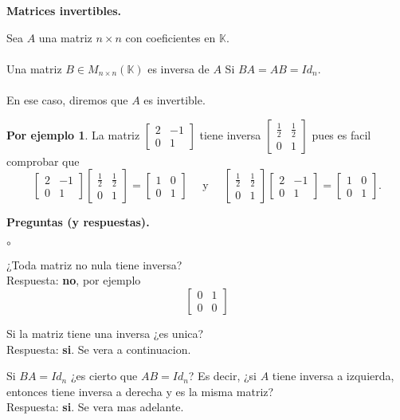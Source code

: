 \documentclass{article}
\theoremstyle{definition}
\theoremstyle{definition}
\newtheorem*{ej}{Por ejemplo}
\theoremstyle{remark}
\begin{document}
\begin{center}
\textbf{Matrices invertibles.}
\end{center}
\begin{defi}
  Sea $A$ una matriz $n \times n$ con coeficientes en $\mathbb{K}$. \\\\
   Una matriz $B \in M_{n \times n}(\mathbb{K})$ es inversa de $A$ Si $BA=AB=Id_n$. \\\\
   En ese caso, diremos que $A$ es invertible.
\end{defi}
\begin{ej}
  La matriz $\begin{bmatrix}2 & -1 \\ 0 & 1 \end{bmatrix}$ tiene inversa $\begin{bmatrix} \tfrac{1}{2} & \tfrac{1}{2} \\ 0 & 1 \end{bmatrix}$ pues es facil comprobar que \[
  \begin{bmatrix}2 & -1 \\ 0 & 1 \end{bmatrix} \begin{bmatrix} \tfrac{1}{2} & \tfrac{1}{2} \\ 0 & 1 \end{bmatrix} = \begin{bmatrix} 1 & 0 \\ 0 & 1 \end{bmatrix} \quad \text{ y } \quad \begin{bmatrix} \tfrac{1}{2} & \tfrac{1}{2} \\ 0 & 1 \end{bmatrix} \begin{bmatrix} 2 & -1 \\ 0 & 1 \end{bmatrix} = \begin{bmatrix}1 & 0 \\ 0 & 1 \end{bmatrix}.
\]
\end{ej}
\begin{center}
\textbf{Preguntas (y respuestas).}
\end{center}
\begin{list}{$\circ$}{}  
\item ¿Toda matriz no nula tiene inversa? \\ Respuesta: \textbf{no}, por ejemplo \[
    \begin{bmatrix} 0 & 1 \\ 0 & 0 \end{bmatrix}
  \]
\item Si la matriz tiene una inversa ¿es unica?\\ Respuesta: \textbf{si}. Se vera a continuacion.
\item Si $BA=Id_n$ ¿es cierto que $AB=Id_n$? Es decir, ¿si $A$ tiene inversa a izquierda, entonces tiene inversa a derecha y es la misma matriz? \\ Respuesta: \textbf{si}. Se vera mas adelante.
\end{list}
\end{document}
